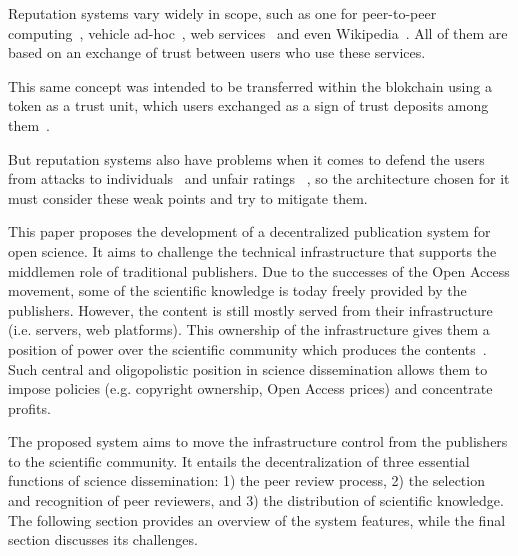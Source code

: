 Reputation systems vary widely in scope, such as one for peer-to-peer
computing~\cite{zhou2007powertrust}, vehicle ad-hoc~\cite{dotzer2005vars}, web
services~\cite{moore2008reputation} and even Wikipedia~\cite{adler2007content}.
All of them are based on an exchange of trust between users who use these
services.

This same concept was intended to be transferred within the blokchain using a
token as a trust unit, which users exchanged as a sign of trust deposits among
them~\cite{sharples2016blockchain}.

But reputation systems also have problems when it comes to defend the users from
attacks to individuals~\cite{hoffman2009survey} and unfair ratings
~\cite{whitby2004filtering}, so the architecture chosen for it must consider
these weak points and try to mitigate them.

This paper proposes the development of a decentralized publication system for
open science. It aims to challenge the technical infrastructure that supports
the middlemen role of traditional publishers. Due to the successes of the Open
Access movement, some of the scientific knowledge is today freely provided by
the publishers. However, the content is still mostly served from their
infrastructure (i.e. servers, web platforms). This ownership of the
infrastructure gives them a position of power over the scientific community
which produces the contents~\cite{fuster2010governance}. Such central and
oligopolistic position in science dissemination allows them to impose policies
(e.g. copyright ownership, Open Access prices) and concentrate profits.

The proposed system aims to move the infrastructure control from the publishers
to the scientific community. It entails the decentralization of three essential
functions of science dissemination: 1) the peer review process, 2) the selection
and recognition of peer reviewers, and 3) the distribution of scientific
knowledge. The following section provides an overview of the system features,
while the final section discusses its challenges.
